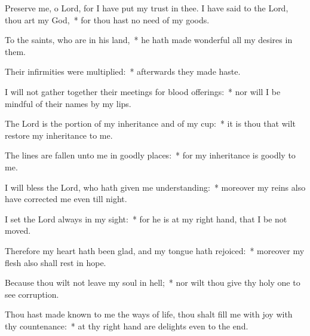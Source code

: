 \begin{enpars}
\item Preserve me, o Lord, for I have put my trust in thee. I have said to the Lord, thou art my God,~* for thou hast no need of my goods.
\item To the saints, who are in his land,~* he hath made wonderful all my desires in them.
\item Their infirmities were multiplied:~* afterwards they made haste.
\item I will not gather together their meetings for blood offerings:~* nor will I be mindful of their names by my lips.
\item The Lord is the portion of my inheritance and of my cup:~* it is thou that wilt restore my inheritance to me.
\item The lines are fallen unto me in goodly places:~* for my inheritance is goodly to me.
\item I will bless the Lord, who hath given me understanding:~* moreover my reins also have corrected me even till night.
\item I set the Lord always in my sight:~* for he is at my right hand, that I be not moved.
\item Therefore my heart hath been glad, and my tongue hath rejoiced:~* moreover my flesh also shall rest in hope.
\item Because thou wilt not leave my soul in hell;~* nor wilt thou give thy holy one to see corruption.
\item Thou hast made known to me the ways of life, thou shalt fill me with joy with thy countenance:~* at thy right hand are delights even to the end.
\end{enpars}